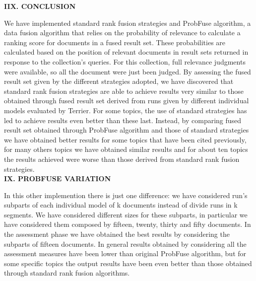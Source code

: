 \documentclass[12pt,journal]{IEEEtran}
\begin{document}
\textbf{IIX. CONCLUSION}

We have implemented standard rank fusion strategies and ProbFuse algorithm, a data fusion algorithm that relies on the probability of relevance to calculate a ranking score for documents in a fused result set.
These probabilities are calculated based on the position of relevant documents in result sets returned in response to the collection’s queries. For this collection, full relevance judgments were available, so all the document were just been judged. 
By assessing the fused result set given by the different strategies adopted, we have discovered that standard rank fusion strategies are able to achieve results very similar to those obtained through fused result set derived from runs given by different individual models evaluated by Terrier. For some topics, the use of standard strategies has led to achieve results even better than these last. Instead, by comparing fused result set obtained through ProbFuse algorithm and those of standard strategies we have obtained better results for some topics that have been cited previously, for many others topics we have obtained similar results and for about ten topics the results achieved were worse than those derived from standard rank fusion strategies. \\

\textbf{IX.	PROBFUSE VARIATION}

In this other implemention there is just one difference: we have considered run's subparts of each individual model of k documents instead of divide runs in k segments. We have considered different sizes for these subparts, in particular we have considered them composed by fifteen, twenty, thirty and fifty documents. In the assessment phase we have obtained the best results by considering the subparts of fifteen documents. In general results obtained by considering all the assessment measures have been lower than original ProbFuse algorithm, but for some specific topics the output results have been even better than those obtained through standard rank fusion algorithms.  \\
\end{document}
